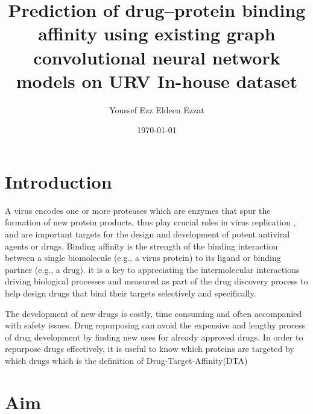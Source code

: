 \documentclass[11pt, a4paper]{article}
\title{Prediction of drug–protein binding affinity using existing graph convolutional neural network models on URV In-house dataset}
\author{Youssef Ezz Eldeen Ezzat}
\date{\today}
\begin{document}


\tableofcontents

\section{Introduction}


A virus encodes one or more proteases which are enzymes that spur the formation of new protein products, thus play crucial roles in virus replication ,
and are important targets for the design and development of potent antiviral agents or drugs.
Binding affinity is the strength of the binding interaction between a single biomolecule (e.g., a virus protein) to its ligand or binding partner (e.g., a drug).
it is a key to appreciating the intermolecular interactions driving biological processes and measured as part of the drug discovery process to help design drugs that bind their targets selectively and specifically.

The development of new drugs is costly, time consuming and often accompanied with safety issues.
Drug repurposing can avoid the expensive and lengthy process of drug development by finding new uses for already approved drugs. In order to repurpose drugs effectively, it is useful to know which proteins are targeted by
which drugs which is the definition of Drug-Target-Affinity(DTA)\cite{1}

\section{Aim}
\end{document}
